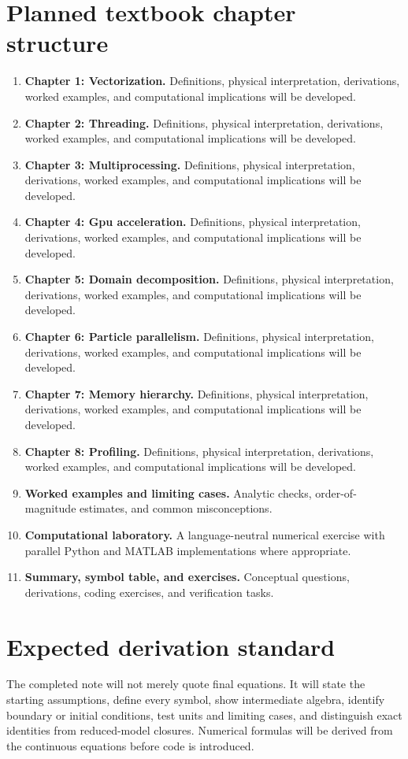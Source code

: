 \documentclass[11pt]{article}
\begin{document}
\section{Planned textbook chapter structure}
\begin{enumerate}[leftmargin=1.8em]
\item \textbf{Chapter 1: Vectorization.} Definitions, physical interpretation, derivations, worked examples, and computational implications will be developed.
\item \textbf{Chapter 2: Threading.} Definitions, physical interpretation, derivations, worked examples, and computational implications will be developed.
\item \textbf{Chapter 3: Multiprocessing.} Definitions, physical interpretation, derivations, worked examples, and computational implications will be developed.
\item \textbf{Chapter 4: Gpu acceleration.} Definitions, physical interpretation, derivations, worked examples, and computational implications will be developed.
\item \textbf{Chapter 5: Domain decomposition.} Definitions, physical interpretation, derivations, worked examples, and computational implications will be developed.
\item \textbf{Chapter 6: Particle parallelism.} Definitions, physical interpretation, derivations, worked examples, and computational implications will be developed.
\item \textbf{Chapter 7: Memory hierarchy.} Definitions, physical interpretation, derivations, worked examples, and computational implications will be developed.
\item \textbf{Chapter 8: Profiling.} Definitions, physical interpretation, derivations, worked examples, and computational implications will be developed.
\item \textbf{Worked examples and limiting cases.} Analytic checks, order-of-magnitude estimates, and common misconceptions.
\item \textbf{Computational laboratory.} A language-neutral numerical exercise with parallel Python and MATLAB implementations where appropriate.
\item \textbf{Summary, symbol table, and exercises.} Conceptual questions, derivations, coding exercises, and verification tasks.
\end{enumerate}

\section{Expected derivation standard}
The completed note will not merely quote final equations. It will state the starting assumptions, define every symbol, show intermediate algebra, identify boundary or initial conditions, test units and limiting cases, and distinguish exact identities from reduced-model closures. Numerical formulas will be derived from the continuous equations before code is introduced.
\end{document}
